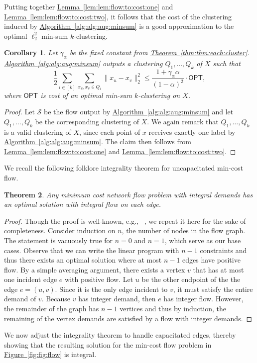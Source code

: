 \documentclass[11pt]{article}
\newtheorem{theorem}{Theorem}[section]
\newtheorem{corollary}[theorem]{Corollary}
\newcommand{\namedref}[2]{\hyperref[#2]{#1~\ref*{#2}}}
\newcommand{\thmlab}[1]{\label{thm:#1}}
\newcommand{\thmref}[1]{\namedref{Theorem}{thm:#1}}
\newcommand{\lemref}[1]{\namedref{Lemma}{lem:#1}}
\newcommand{\corlab}[1]{\label{cor:#1}}
\newcommand{\figref}[1]{\namedref{Figure}{fig:#1}}
\renewcommand{\algref}[1]{\namedref{Algorithm}{alg:#1}}
\def \OPT    {\mdef{\mathsf{OPT}}}
\def \calS    {\mdef{\mathcal{S}}}
\newcommand{\mdef}[1]{{\ensuremath{#1}}\xspace}  %
\begin{document}
Putting together \lemref{lem:flow:to:cost:one} and \lemref{lem:flow:to:cost:two}, it follows that the cost of the clustering induced by \algref{alg:aug:minsum} is a good approximation to the optimal $\ell_2^2$ min-sum $k$-clustering. 
\begin{corollary}
\corlab{cor:aug:correctness}
Let $\gamma_\alpha$ be the fixed constant from \thmref{thm:each:cluster}. 
\algref{alg:aug:minsum} outputs a clustering $Q_1,\ldots,Q_k$ of $X$ such that
\[\frac{1}{2}\sum_{i\in[k]}\sum_{x_u,x_v\in Q_i}\|x_u-x_v\|_2^2\le\frac{1+\gamma_\alpha\alpha}{(1-\alpha)^2}\cdot\OPT,\]
where $\OPT$ is cost of an optimal min-sum $k$-clustering on $X$. 
\end{corollary}
\begin{proof}
Let $\calS$ be the flow output by \algref{alg:aug:minsum} and let $Q_1,\ldots,Q_k$ be the corresponding clustering of $X$. 
We again remark that $Q_1,\ldots,Q_k$ is a valid clustering of $X$, since each point of $x$ receives exactly one label by \algref{alg:aug:minsum}. 
The claim then follows from \lemref{lem:flow:to:cost:one} and \lemref{lem:flow:to:cost:two}. 
\end{proof}
We recall the following folklore integrality theorem for uncapacitated min-cost flow. 
\begin{theorem}
\thmlab{thm:integral:sol}
Any minimum cost network flow problem with integral demands has an optimal solution with integral flow on each edge. 
\end{theorem}
\begin{proof}
Though the proof is well-known, e.g., ~\cite{Conitzer12}, we repeat it here for the sake of completeness. 
Consider induction on $n$, the number of nodes in the flow graph. 
The statement is vacuously true for $n=0$ and $n=1$, which serve as our base cases. 
Observe that we can write the linear program with $n-1$ constraints and thus there exists an optimal solution where at most $n-1$ edges have positive flow. 
By a simple averaging argument, there exists a vertex $v$ that has at most one incident edge $e$ with positive flow. 
Let $u$ be the other endpoint of the the edge $e=(u,v)$. 
Since it is the only edge incident to $v$, it must satisfy the entire demand of $v$. 
Because $v$ has integer demand, then $e$ has integer flow. 
However, the remainder of the graph has $n-1$ vertices and thus by induction, the remaining of the vertex demands are satisfied by a flow with integer demands. 
\end{proof}
We now adjust the integrality theorem to handle capacitated edges, thereby showing that the resulting solution for the min-cost flow problem in \figref{fig:flow} is integral.
\end{document}
